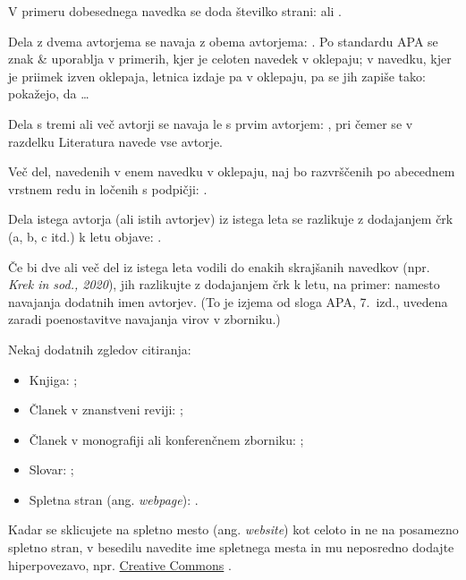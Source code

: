 \documentclass{article}
\begin{document}
V primeru dobesednega navedka se doda številko strani: \parencite[107]{leech1992corpora} ali \parencite[107--108]{leech1992corpora}. 

Dela z dvema avtorjema se navaja z obema avtorjema: \parencite{studije2005korpusnem}. Po standardu APA \parencite[gl.][]{apa-author-date} se znak \& uporablja v primerih, kjer je celoten navedek v oklepaju; v navedku, kjer je  priimek izven oklepaja, letnica izdaje pa v oklepaju, pa se jih zapiše tako: \textcite{studije2005korpusnem} pokažejo, da \ldots{}    

Dela s tremi ali več avtorji se navaja le s prvim avtorjem: \parencite{biber1998corpus}, pri čemer se v razdelku Literatura navede vse avtorje. 

Več del, navedenih v enem navedku v oklepaju, naj bo razvrščenih po abecednem vrstnem redu in ločenih s podpičji: \parencite{erjavec-infotheca, tei}. 

Dela istega avtorja (ali istih avtorjev) iz istega leta se razlikuje z dodajanjem črk (a, b, c itd.) k letu objave: \parencite{erjavec-multext}. 

Če bi dve ali več del iz istega leta vodili do enakih skrajšanih navedkov (npr. \textit{Krek in sod., 2020}), jih razlikujte z dodajanjem črk k letu, na primer:  \parencite{krek2020a-ssj500k, krek2020b-gf} namesto navajanja dodatnih imen avtorjev. (To je izjema od sloga APA, 7.\ izd., uvedena zaradi poenostavitve navajanja virov v zborniku.)

Nekaj dodatnih zgledov citiranja:

    \begin{itemize}
        \item Knjiga: \parencite{biber1998corpus, studije2005korpusnem};
        \item Članek v znanstveni reviji: \parencite{biber1996investigating, erjavec-infotheca};
        \item Članek v monografiji ali konferenčnem zborniku: \parencite{leech1992corpora, erjavec-multext};
        \item Slovar: \parencite{sinclair1987collins, sskj};
        \item Spletna stran (ang. \textit{webpage}): \parencite{scott2008wordsmith, tei}.
    \end{itemize}

Kadar se sklicujete na spletno mesto (ang. \textit{website}) kot celoto in ne na posamezno spletno stran, v besedilu navedite ime spletnega mesta in mu neposredno dodajte hiperpovezavo, npr. \href{http://creativecommons.org/}{Creative Commons} \parencite{apa-website}.
\end{document}
